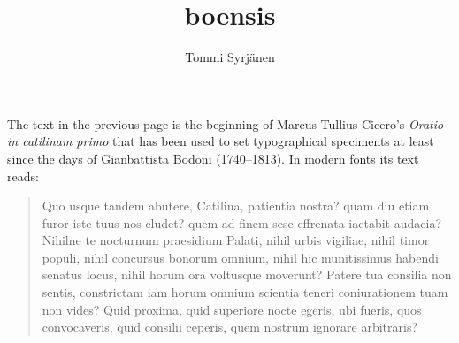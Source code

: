 \documentclass[a4paper]{article}
\begin{document}


\title{\fontsize{36}{36}boensis}
\author{Tommi Syrjänen}

\maketitle


\begin{center}
  
\begin{minipage}{10.5cm}
  {{\fontsize{16}{19}\abcursivefamily
}}

\end{minipage}
\end{center}

\thispagestyle{empty}



\newpage


\newpage


The text in the previous page is the beginning of Marcus Tullius
Cicero's \emph{Oratio in catilinam primo} that has been used to set
typographical speciments at least since the days of Gianbattista Bodoni
(1740–1813). In modern fonts its text reads:

\thispagestyle{empty}

\begin{quote}
  Quo usque tandem abutere, Catilina, patientia nostra? quam diu etiam
  furor iste tuus nos eludet? quem ad finem sese effrenata iactabit
  audacia? Nihilne te nocturnum praesidium Palati, nihil urbis
  vigiliae, nihil timor populi, nihil concursus bonorum omnium, nihil
  hic munitissimus habendi senatus locus, nihil horum ora voltusque
  moverunt? Patere tua consilia non sentis, constrictam iam horum
  omnium scientia teneri coniurationem tuam non vides? Quid proxima,
  quid superiore nocte egeris, ubi fueris, quos convocaveris, quid
  consilii ceperis, quem nostrum ignorare arbitraris? 
\end{quote}
\end{document}
